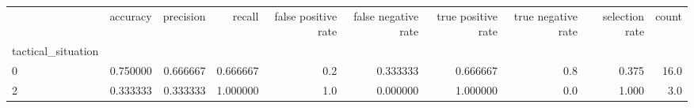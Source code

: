 \begin{tabular}{lrrrrrrrrr}
\toprule
{} &  accuracy &  precision &    recall &  false positive rate &  false negative rate &  true positive rate &  true negative rate &  selection rate &  count \\
tactical\_situation &           &            &           &                      &                      &                     &                     &                 &        \\
\midrule
0                  &  0.750000 &   0.666667 &  0.666667 &                  0.2 &             0.333333 &            0.666667 &                 0.8 &           0.375 &   16.0 \\
2                  &  0.333333 &   0.333333 &  1.000000 &                  1.0 &             0.000000 &            1.000000 &                 0.0 &           1.000 &    3.0 \\
\bottomrule
\end{tabular}
